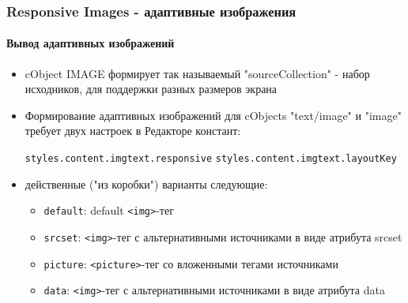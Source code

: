 \begin{frame}[fragile]
	\frametitle{Responsive Images - адаптивные изображения}
	\framesubtitle{Вывод адаптивных изображений}

	\begin{itemize}
		\item cObject IMAGE формирует так называемый "sourceCollection" - набор исходников, для поддержки разных размеров экрана
		\item Формирование адаптивных изображений для cObjects "text/image" и "image" требует двух настроек в Редакторе констант:

			\texttt{styles.content.imgtext.responsive}\newline
			\texttt{styles.content.imgtext.layoutKey}

		\item действенные ("из коробки") варианты следующие:

			\begin{itemize}
				\item \texttt{default}:	\tabto{2cm} default \texttt{<img>}-тег
				\item \texttt{srcset}:	\tabto{2cm} \texttt{<img>}-тег с альтернативными источниками в виде атрибута srcset
				\item \texttt{picture}:	\tabto{2cm} \texttt{<picture>}-тег со вложенными тегами источниками
				\item \texttt{data}:	\tabto{2cm} \texttt{<img>}-тег с альтернативными источниками в виде атрибута data
			\end{itemize}

	\end{itemize}

\end{frame}


